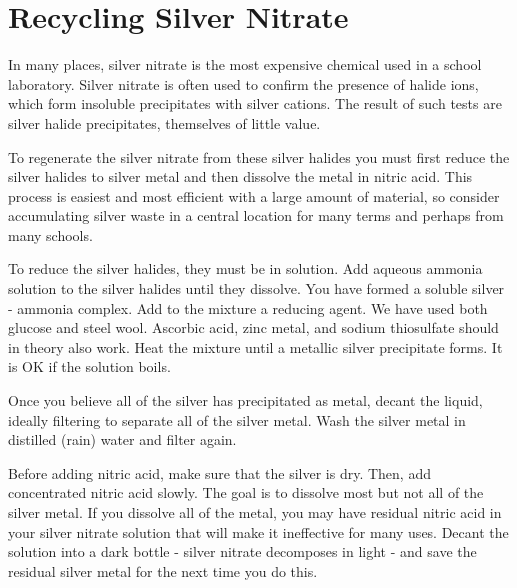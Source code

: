 \chapter{Recycling Silver Nitrate}

In many places, 
silver nitrate is the most expensive chemical 
used in a school laboratory. 
Silver nitrate is often used to confirm the presence of halide ions, 
which form insoluble precipitates with silver cations. 
The result of such tests are silver halide precipitates, 
themselves of little value.

To regenerate the silver nitrate from these silver halides 
you must first reduce the silver halides to silver metal 
and then dissolve the metal in nitric acid. 
This process is easiest and most efficient 
with a large amount of material, 
so consider accumulating silver waste in a central location 
for many terms and perhaps from many schools.

To reduce the silver halides, 
they must be in solution. 
Add aqueous ammonia solution to the silver halides until they dissolve. 
You have formed a soluble silver - ammonia complex. 
Add to the mixture a reducing agent. 
We have used both glucose and steel wool. 
Ascorbic acid, 
zinc metal, 
and sodium thiosulfate should in theory also work. 
Heat the mixture until a metallic silver precipitate forms. 
It is OK if the solution boils.

Once you believe all of the silver has precipitated as metal, 
decant the liquid, 
ideally filtering to separate all of the silver metal. 
Wash the silver metal in distilled (rain) water and filter again.

Before adding nitric acid, 
make sure that the silver is dry. 
Then, 
add concentrated nitric acid slowly. 
The goal is to dissolve most but not all of the silver metal. 
If you dissolve all of the metal, 
you may have residual nitric acid in your silver nitrate solution 
that will make it ineffective for many uses. 
Decant the solution into a dark bottle - 
silver nitrate decomposes in light - 
and save the residual silver metal for the next time you do this.
